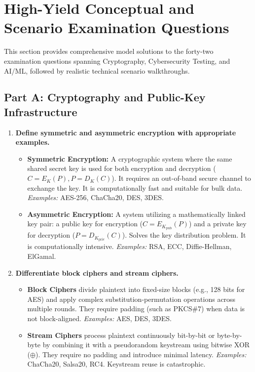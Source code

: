\newpage

\section{High-Yield Conceptual and Scenario Examination Questions}

This section provides comprehensive model solutions to the forty-two examination questions spanning Cryptography, Cybersecurity Testing, and AI/ML, followed by realistic technical scenario walkthroughs.

\subsection{Part A: Cryptography and Public-Key Infrastructure}

\begin{enumerate}[label=\textbf{Q\arabic*.},leftmargin=1.2cm]
\item \textbf{Define symmetric and asymmetric encryption with appropriate examples.}
\begin{itemize}
\item \textbf{Symmetric Encryption:} A cryptographic system where the same shared secret key is used for both encryption and decryption ($C = E_K(P), P = D_K(C)$). It requires an out-of-band secure channel to exchange the key. It is computationally fast and suitable for bulk data. \textit{Examples:} AES-256, ChaCha20, DES, 3DES.
\item \textbf{Asymmetric Encryption:} A system utilizing a mathematically linked key pair: a public key for encryption ($C = E_{K_{\text{pub}}}(P)$) and a private key for decryption ($P = D_{K_{\text{priv}}}(C)$). Solves the key distribution problem. It is computationally intensive. \textit{Examples:} RSA, ECC, Diffie-Hellman, ElGamal.
\end{itemize}

\item \textbf{Differentiate block ciphers and stream ciphers.}
\begin{itemize}
\item \textbf{Block Ciphers} divide plaintext into fixed-size blocks (e.g., 128 bits for AES) and apply complex substitution-permutation operations across multiple rounds. They require padding (such as PKCS\#7) when data is not block-aligned. \textit{Examples:} AES, DES, 3DES.
\item \textbf{Stream Ciphers} process plaintext continuously bit-by-bit or byte-by-byte by combining it with a pseudorandom keystream using bitwise XOR ($\oplus$). They require no padding and introduce minimal latency. \textit{Examples:} ChaCha20, Salsa20, RC4. Keystream reuse is catastrophic.
\end{itemize}


\end{enumerate}
